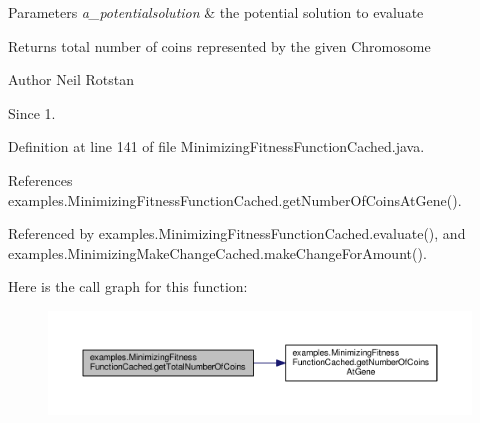 \begin{DoxyParams}{Parameters}
{\em a\-\_\-potentialsolution} & the potential solution to evaluate \\
\hline
\end{DoxyParams}
\begin{DoxyReturn}{Returns}
total number of coins represented by the given Chromosome
\end{DoxyReturn}
\begin{DoxyAuthor}{Author}
Neil Rotstan 
\end{DoxyAuthor}
\begin{DoxySince}{Since}
1. 
\end{DoxySince}


Definition at line 141 of file Minimizing\-Fitness\-Function\-Cached.\-java.



References examples.\-Minimizing\-Fitness\-Function\-Cached.\-get\-Number\-Of\-Coins\-At\-Gene().



Referenced by examples.\-Minimizing\-Fitness\-Function\-Cached.\-evaluate(), and examples.\-Minimizing\-Make\-Change\-Cached.\-make\-Change\-For\-Amount().



Here is the call graph for this function\-:
\nopagebreak
\begin{figure}[H]
\begin{center}
\leavevmode
\includegraphics[width=350pt]{classexamples_1_1_minimizing_fitness_function_cached_a99606d90aa0cbb78318d5752df291f9c_cgraph}
\end{center}
\end{figure}




